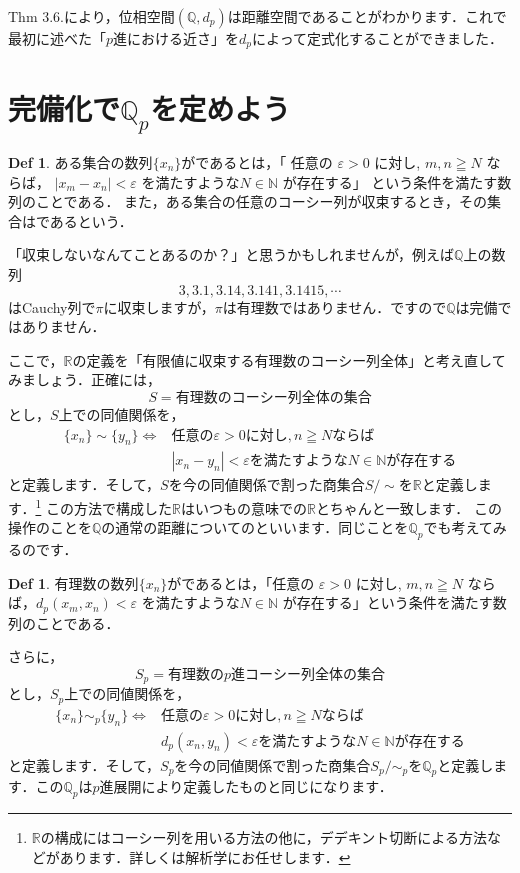 \documentclass[./main]{subfiles}
\theoremstyle{definition}
\newtheorem{defi}[theo]{Def}
\newcommand{\N}{\mathbb{N}}%
\newcommand{\Q}{\mathbb{Q}}%
\newcommand{\Qp}{\mathbb{Q}_p}%
\newcommand{\R}{\mathbb{R}}%
\newcommand{\abs}[1]{\left\lvert#1\right\rvert}%
\begin{document}
Thm 3.6.により，位相空間$(\Q,d_p)$は距離空間であることがわかります．これで最初に述べた「$p$進における近さ」を$d_p$によって定式化することができました．


\section{完備化で$\Qp$を定めよう}

\begin{defi}
	ある集合の数列$\{x_n\}$がであるとは，「	任意の $\varepsilon > 0$ に対し, $m,n \geqq N$ ならば，	$\abs{x_m - x_n}<\varepsilon$ を満たすような$N \in \N$ が存在する」	という条件を満たす数列のことである．
	また，ある集合の任意のコーシー列が収束するとき，その集合はであるという．
\end{defi}

「収束しないなんてことあるのか？」と思うかもしれませんが，例えば$\Q$上の数列
\[
3, 3.1, 3.14, 3.141, 3.1415, \cdots
\]
はCauchy列で$\pi$に収束しますが，$\pi$は有理数ではありません．ですので$\Q$は完備ではありません．

ここで，$\R$の定義を「有限値に収束する有理数のコーシー列全体」と考え直してみましょう．正確には，
\[
S=有理数のコーシー列全体の集合
\]
とし，$S$上での同値関係を，
\begin{equation*}
	\begin{split}
	\{x_n\} \sim \{y_n\} \Longleftrightarrow & 任意の \varepsilon > 0 に対し,  n \geqq N ならば \\
	&\abs{x_n - y_n}<\varepsilon を満たすようなN \in \N が存在する
	\end{split}
\end{equation*}
と定義します．そして，$S$を今の同値関係で割った商集合$S/{\sim}$を$\R$と定義します．\footnote{$\R$の構成にはコーシー列を用いる方法の他に，デデキント切断による方法などがあります．詳しくは解析学にお任せします．} この方法で構成した$\R$はいつもの意味での$\R$とちゃんと一致します．
この操作のことを$\Q$の通常の距離についてのといいます．同じことを$\Qp$でも考えてみるのです．

\begin{defi}
	有理数の数列$\{x_n\}$がであるとは，「任意の $\varepsilon > 0$ に対し, $m,n \geqq N$ ならば，$d_p(x_m,x_n)<\varepsilon$ を満たすような$N \in \N$ が存在する」という条件を満たす数列のことである．
\end{defi}

さらに，
\[
S_p=有理数のp進コーシー列全体の集合
\]
とし，$S_p$上での同値関係を，
\begin{equation*}
	\begin{split}
	\{x_n\} \sim_p \{y_n\} \Longleftrightarrow &任意の \varepsilon > 0 に対し,  n \geqq N ならば \\
	&d_p(x_n, y_n)<\varepsilon を満たすようなN \in \N が存在する
	\end{split}
\end{equation*}
と定義します．そして，$S_p$を今の同値関係で割った商集合$S_p/{\sim_p}$を$\Qp$と定義します．この$\Qp$は$p$進展開により定義したものと同じになります．
\end{document}
